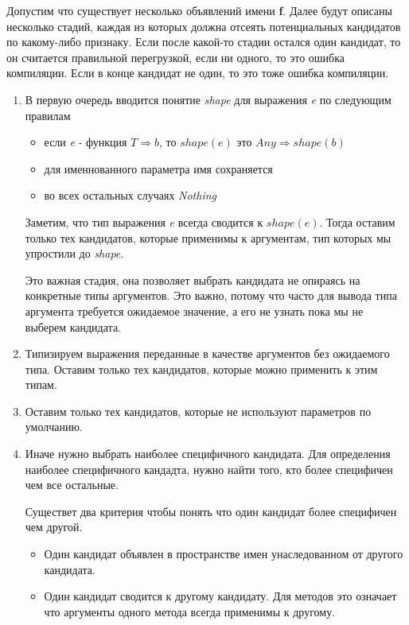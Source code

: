 Допустим что существует несколько объявлений имени \textbf{f}.
Далее будут описаны несколько стадий, каждая из которых должна отсеять
потенциальных кандидатов по какому-либо признаку.
Если после какой-то стадии остался один кандидат, то он считается правильной
перегрузкой, если ни одного, то это ошибка компиляции.
Если в конце кандидат не один, то это тоже ошибка компиляции.

\begin{enumerate}
  \item В первую очередь вводится понятие \textit{shape} для выражения
  \textit{e} по следующим правилам
  \begin{itemize}
    \item если \textit{e} - функция $\mathit{T \Rightarrow b}$,
    то $\mathit{shape}(\mathit{e})$ это $\mathit{Any \Rightarrow shape}(\mathit{b})$
    \item для именнованного параметра имя сохраняется
    \item во всех остальных случаях \textit{Nothing}
  \end{itemize}

  Заметим, что тип выражения \textit{e} всегда сводится к $\mathit{shape}(\mathit{e})$.
  Тогда оставим только тех кандидатов, которые применимы к аргументам, тип которых
  мы упростили до \textit{shape}.

  Это важная стадия, она позволяет выбрать кандидата не опираясь на конкретные
  типы аргументов.
  Это важно, потому что часто для вывода типа аргумента требуется ожидаемое
  значение, а его не узнать пока мы не выберем кандидата.

  \item Типизируем выражения переданные в качестве аргументов без ожидаемого типа.
  Оставим только тех кандидатов, которые можно применить к этим типам.

  \item Оставим только тех кандидатов, которые не используют параметров по умолчанию.

  \item Иначе нужно выбрать наиболее специфичного кандидата.
  Для определения наиболее специфичного кандадта, нужно найти того, кто более
  специфичен чем все остальные.

  Существет два критерия чтобы понять что один кандидат более специфичен чем
  другой.
  \begin{itemize}
    \item Один кандидат объявлен в пространстве имен унаследованном от другого
    кандидата.
    \item Один кандидат сводится к другому кандидату. Для методов это означает
    что аргументы одного метода всегда применимы к другому.
  \end{itemize}
\end{enumerate}


